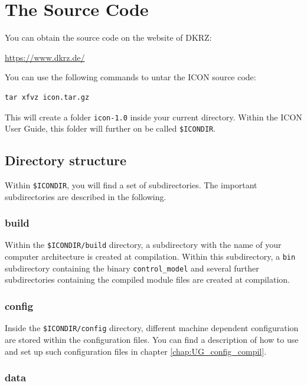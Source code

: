 \section{The Source Code}
You can obtain the source code on the website of DKRZ:

\href{https://www.dkrz.de/}{https://www.dkrz.de/}

You can use the following commands to untar the ICON source code:

\begin{verbatim}
tar xfvz icon.tar.gz
\end{verbatim}

This will create a folder \verb+icon-1.0+ inside your current directory. Within the ICON User Guide, this folder will further on be called \verb+$ICONDIR+.

\subsection{Directory structure}

Within \verb+$ICONDIR+, you will find a set of subdirectories. The important subdirectories are described in the following. 

\subsubsection{build}

Within the \verb+$ICONDIR/build+ directory, a subdirectory with the name of your computer architecture is created at compilation. Within this subdirectory, a \verb+bin+ subdirectory containing the binary \verb+control_model+ and several further subdirectories containing the compiled module files are created at compilation. 

\subsubsection{config}

Inside the \verb+$ICONDIR/config+ directory, different machine dependent configuration are stored within the configuration files. You can find a description of how to use and set up such configuration files in chapter \ref{chap:UG_config_compil}.

\subsubsection{data}

